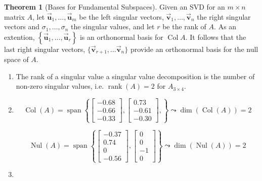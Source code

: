 \documentclass[letter,11pt]{article}
\theoremstyle{definition}
\newtheorem{theorem}{Theorem}[section]
\newcommand{\vvec}{\vec{\boldsymbol{v}}}
\newcommand{\uvec}{\vec{\boldsymbol{u}}}
\begin{document}
\begin{tcolorbox}[boxrule=1mm,enhanced jigsaw, breakable,before=\hfill,after=\hfill,adjusted title={Problem 5 solutions}]
    \begin{theorem}[Bases for Fundamental Subspaces] Given an SVD for an $m\times n$ matrix $A$, let $\uvec_1, \ldots, \uvec_m$ be the left singular vectors, $\vvec_1, \ldots, \vvec_n$ the right singular vectors and $\sigma_1, \ldots, \sigma_n$ the singular values, and let $r$ be the rank of $A$. As an extention, $ \left\{\uvec_1, \ldots, \uvec_r\right\}$ is an orthonormal basis for $\operatorname{Col} A$. It follows that the last right singular vectors, $\{\vvec_{r+1},\ldots \vvec_{n}\}$ provide an orthonormal basis for the null space of $A$.
    \end{theorem}
    \tcblower
    \begin{enumerate}[label = \alph*.)]
        \item The rank of a singular value a singular value decomposition is the number of non-zero singular values, i.e. $\operatorname{rank} \left(A\right) = 2$ for $A_{3\times 4}$.
        \item 
    $$\operatorname{Col}(A) = \operatorname{span}\left\{\begin{bmatrix} -0.68 \\ -0.66 \\ -0.33 \end{bmatrix}, \begin{bmatrix} 0.73 \\ -0.61 \\ -0.30 \end{bmatrix},\right\} \leadsto \operatorname{dim}\left(\operatorname{Col}(A)\right) = 2$$
     
    $$\operatorname{Nul}(A) = \operatorname{span}\left\{\begin{bmatrix} -0.37 \\ 0.74 \\ 0 \\ -0.56 \end{bmatrix},\begin{bmatrix} 0 \\ 0 \\ -1 \\ 0 \end{bmatrix}\right\} \leadsto \operatorname{dim}\left(\operatorname{Nul}(A)\right) = 2$$

    \item 
    

\end{enumerate}
\end{tcolorbox}
\end{document}
